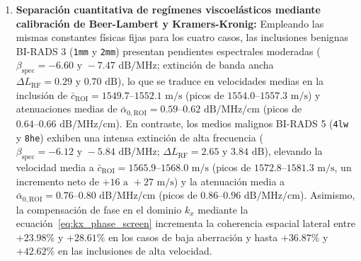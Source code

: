 \documentclass[9pt]{article}
\begin{document}
\begin{enumerate}
    \item \textbf{Separación cuantitativa de regímenes viscoelásticos mediante calibración de Beer-Lambert y Kramers-Kronig:} Empleando las mismas constantes físicas fijas para los cuatro casos, las inclusiones benignas BI-RADS 3 (\texttt{1mm} y \texttt{2mm}) presentan pendientes espectrales moderadas ($\beta_{\text{spec}} = -6.60\text{ y }-7.47\text{ dB/MHz}$; extinción de banda ancha $\Delta L_{\text{RF}} = 0.29\text{ y }0.70\text{ dB}$), lo que se traduce en velocidades medias en la inclusión de $\bar{c}_{\text{ROI}} = 1549.7\text{--}1552.1\text{ m/s}$ (picos de $1554.0\text{--}1557.3\text{ m/s}$) y atenuaciones medias de $\bar{\alpha}_{0,\text{ROI}} = 0.59\text{--}0.62\text{ dB/MHz/cm}$ (picos de $0.64\text{--}0.66\text{ dB/MHz/cm}$). En contraste, los medios malignos BI-RADS 5 (\texttt{4lw} y \texttt{8he}) exhiben una intensa extinción de alta frecuencia ($\beta_{\text{spec}} = -6.12\text{ y }-5.84\text{ dB/MHz}$; $\Delta L_{\text{RF}} = 2.65\text{ y }3.84\text{ dB}$), elevando la velocidad media a $\bar{c}_{\text{ROI}} = 1565.9\text{--}1568.0\text{ m/s}$ (picos de $1572.8\text{--}1581.3\text{ m/s}$, un incremento neto de $+16\text{ a }+27\text{ m/s}$) y la atenuación media a $\bar{\alpha}_{0,\text{ROI}} = 0.76\text{--}0.80\text{ dB/MHz/cm}$ (picos de $0.86\text{--}0.96\text{ dB/MHz/cm}$). Asimismo, la compensación de fase en el dominio $k_x$ mediante la ecuación~\eqref{eq:kx_phase_screen} incrementa la coherencia espacial lateral entre $+23.98\%$ y $+28.61\%$ en los casos de baja aberración y hasta $+36.87\%$ y $+42.62\%$ en las inclusiones de alta velocidad.
\end{enumerate}
\end{document}
